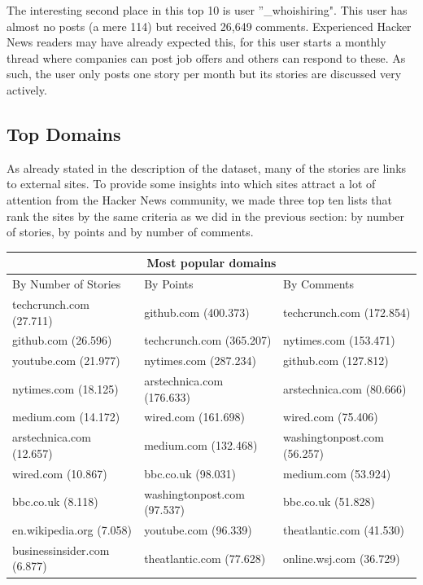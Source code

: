 The interesting second place in this top 10 is user ''\_whoishiring". This user has almost no posts (a mere 114) but received 26,649 comments. Experienced Hacker News readers may have already expected this, for this user starts a monthly thread where companies can post job offers and others can respond to these. As such, the user only posts one story per month but its stories are discussed very actively.

\subsection{Top Domains}
As already stated in the description of the dataset, many of the stories are links to external sites. To provide some insights into which sites attract a lot of attention from the Hacker News community, we made three top ten lists that rank the sites by the same criteria as we did in the previous section: by number of stories, by points and by number of comments.

\begin{center}
    \begin{tabular}{|p{4.5cm}|p{=5cm}|p{5cm}|}
       \hline
       \multicolumn{3}{|c|}{Most popular domains} \\
       \hline
       By Number of Stories 			& By Points 									& By Comments \\
       \hline
       techcrunch.com (27.711) 	& github.com (400.373)		       & techcrunch.com (172.854) \\
		github.com (26.596) 			& techcrunch.com (365.207) 	   & nytimes.com (153.471) \\
		youtube.com (21.977) 		& nytimes.com (287.234)		   & github.com (127.812) \\
		nytimes.com (18.125) 		& arstechnica.com (176.633)	   & arstechnica.com (80.666) \\
		medium.com (14.172) 		& wired.com (161.698)		  	   & wired.com (75.406) \\
		arstechnica.com (12.657) 	& medium.com (132.468)		   & washingtonpost.com (56.257) \\
		wired.com (10.867) 			& bbc.co.uk (98.031)		  		   & medium.com (53.924) \\
		bbc.co.uk (8.118) 				& washingtonpost.com (97.537) & bbc.co.uk (51.828) \\
		en.wikipedia.org (7.058) 		& youtube.com (96.339)		  	   & theatlantic.com (41.530) \\
		businessinsider.com (6.877) & theatlantic.com (77.628)	   & online.wsj.com (36.729) \\
        \hline
    \end{tabular}
\end{center}

